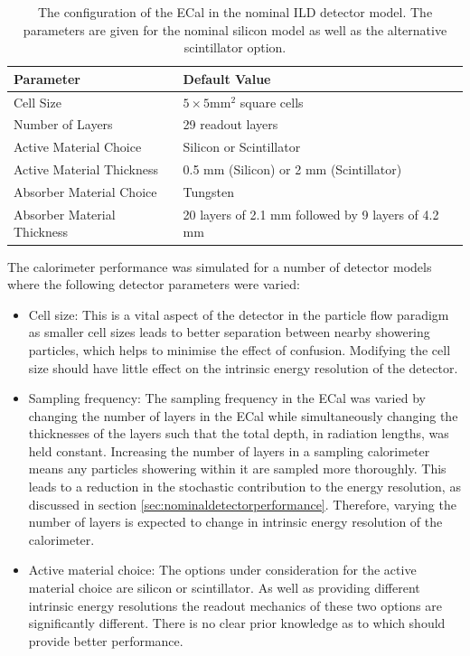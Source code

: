\begin{table}[h!]
\centering
\begin{tabular}{ l l}
\hline
Parameter & Default Value \\
\hline
Cell Size & $5 \times 5 \text{mm}^{2}$ square cells \\
Number of Layers & 29 readout layers \\
Active Material Choice & Silicon or Scintillator  \\
Active Material Thickness & 0.5 mm (Silicon) or 2 mm (Scintillator)  \\
Absorber Material Choice & Tungsten \\
Absorber Material Thickness & 20 layers of 2.1 mm followed by 9 layers of 4.2 mm \\
\hline
\end{tabular}
\caption[The configuration of the ECal in the nominal ILD detector model.  The parameters are given for the nominal silicon model as well as the alternative scintillator option.]{The configuration of the ECal in the nominal ILD detector model.  The parameters are given for the nominal silicon model as well as the alternative scintillator option.}
\label{table:defaultildecal}
\end{table}

The calorimeter performance was simulated for a number of detector models where the following detector parameters were varied:
\begin{itemize}
\item Cell size:  This is a vital aspect of the detector in the particle flow paradigm as smaller cell sizes leads to better separation between nearby showering particles, which helps to minimise the effect of confusion.  Modifying the cell size should have little effect on the intrinsic energy resolution of the detector.  
\item Sampling frequency:  The sampling frequency in the ECal was varied by changing the number of layers in the ECal while simultaneously changing the thicknesses of the layers such that the total depth, in radiation lengths, was held constant.  Increasing the number of layers in a sampling calorimeter means any particles showering within it are sampled more thoroughly.  This leads to a reduction in the stochastic contribution to the energy resolution, as discussed in section \ref{sec:nominaldetectorperformance}.  Therefore, varying the number of layers is expected to change in intrinsic energy resolution of the calorimeter.  
\item Active material choice:  The options under consideration for the active material choice are silicon or scintillator.  As well as providing different intrinsic energy resolutions the readout mechanics of these two options are significantly different.  There is no clear prior knowledge as to which should provide better performance. 
\end{itemize}


